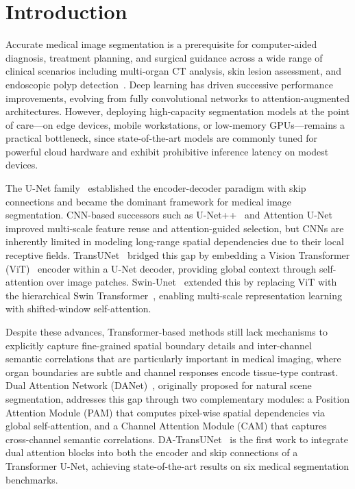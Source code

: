 \documentclass[conference]{IEEEtran}
\begin{document}
\section{Introduction}

Accurate medical image segmentation is a prerequisite for computer-aided diagnosis, treatment planning, and surgical guidance across a wide range of clinical scenarios including multi-organ CT analysis, skin lesion assessment, and endoscopic polyp detection~\cite{ronneberger2015unet}. Deep learning has driven successive performance improvements, evolving from fully convolutional networks to attention-augmented architectures. However, deploying high-capacity segmentation models at the point of care---on edge devices, mobile workstations, or low-memory GPUs---remains a practical bottleneck, since state-of-the-art models are commonly tuned for powerful cloud hardware and exhibit prohibitive inference latency on modest devices.

The U-Net family~\cite{ronneberger2015unet} established the encoder-decoder paradigm with skip connections and became the dominant framework for medical image segmentation. CNN-based successors such as U-Net++~\cite{zhou2018unetpp} and Attention U-Net~\cite{oktay2018attention} improved multi-scale feature reuse and attention-guided selection, but CNNs are inherently limited in modeling long-range spatial dependencies due to their local receptive fields. TransUNet~\cite{chen2021transunet} bridged this gap by embedding a Vision Transformer (ViT)~\cite{dosovitskiy2020image} encoder within a U-Net decoder, providing global context through self-attention over image patches. Swin-Unet~\cite{cao2022swinunet} extended this by replacing ViT with the hierarchical Swin Transformer~\cite{liu2021swin}, enabling multi-scale representation learning with shifted-window self-attention.

Despite these advances, Transformer-based methods still lack mechanisms to explicitly capture fine-grained spatial boundary details and inter-channel semantic correlations that are particularly important in medical imaging, where organ boundaries are subtle and channel responses encode tissue-type contrast. Dual Attention Network (DANet)~\cite{fu2019dual}, originally proposed for natural scene segmentation, addresses this gap through two complementary modules: a Position Attention Module (PAM) that computes pixel-wise spatial dependencies via global self-attention, and a Channel Attention Module (CAM) that captures cross-channel semantic correlations. DA-TransUNet~\cite{sun2024datransunet} is the first work to integrate dual attention blocks into both the encoder and skip connections of a Transformer U-Net, achieving state-of-the-art results on six medical segmentation benchmarks.
\end{document}
